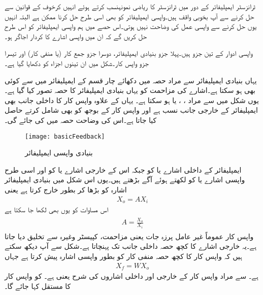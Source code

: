 
ٹرانزسٹر ایمپلیفائر کے دور میں ٹرانزسٹر کا ریاضی نمونہنسب کرتے ہوئے انہیں کرخوف کے قوانین سے حل کرنے سے آپ بخوبی واقف ہیں۔واپسی ایمپلیفائر کو بھی اسی طرح حل کرنا ممکن ہے البتہ انہیں یوں حل کرنے سے واپسی عمل کی وضاحت نہیں ہوتی۔اس حصے میں ہم واپسی ایمپلیفائر کو اس طرح حل کریں گے کہ ان میں واپسی اشارے کا کردار اجاگر ہو۔

واپسی ادوار کے تین جزو ہیں۔پہلا جزو بنیادی ایمپلیفائر، دوسرا جزو جمع کار (یا منفی کار) اور تیسرا جزو واپس کار۔شکل  میں ان تینوں اجزاء کو دکھایا گیا ہے۔

یہاں بنیادی ایمپلیفائر سے مراد حصہ  میں دکھائے چار قسم کے ایمپلیفائر میں سے کوئی بھی ہو سکتا ہے۔اشارے کی مزاحمت  کو یہاں بنیادی ایمپلیفائر کا حصہ تصور کیا گیا ہے۔ یوں شکل  میں  سے مراد  ،  ،  یا  ہو سکتا ہے۔ یہاں  کے علاوہ واپس کار کا داخلی جانب  بھی ایمپلیفائر کے خارجی جانب نسب ہے  اور  واپس کار کے بوجھ کو بھی شامل کرتے حاصل کیا جاتا ہے۔اس کی وضاحت حصہ  میں کی جائے گی۔
\begin{figure}
\centering
\texttt{[image: basicFeedback]}
\caption{بنیادی واپسی ایمپلیفائر}
\label{شکل_بنیادی_واپسی_ایمپلیفائر}
\end{figure}
ایمپلیفائر کے داخلی اشارے  یا  کو  جبکہ اس کے خارجی اشارے  یا  کو   اور اسی طرح واپسی اشارے  یا  کو  لکھتے ہوئے آگے بڑھتے ہیں۔یوں اس شکل میں بنیادی ایمپلیفائر اشارہ  کو بڑھا کر بطور  خارج کرتا ہے یعنی
\begin{align}
X_o = A X_i
\end{align}
 اس مساوات کو یوں بھی لکھا جا سکتا ہے
\begin{gather} \label{مساوات_واپسی_افزائش}
\begin{aligned}
A =\frac{X_o}{X_i}
\end{aligned}
\end{gather}
واپس کار عموماً غیر عامل پرزہ جات یعنی مزاحمت، کپیسٹر وغیرہ سے تخلیق دیا جاتا ہے۔یہ  خارجی اشارے کا کچھ حصہ داخلی جانب تک پہنچاتا ہے۔شکل سے آپ دیکھ سکتے ہیں کہ واپس کار   کا کچھ حصہ منفی کار کو بطور واپسی اشارہ   پیش کرتا ہے جہاں
\begin{align} \label{مساوات_واپسی_واپسی_اشارہ}
X_f = W X_o
\end{align}
ہے۔ سے مراد واپس کار کے خارجی اور داخلی اشاروں کی شرح یعنی  ہے۔ کو واپس کار کا مستقل کہا جائے گا۔

